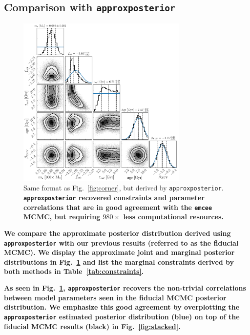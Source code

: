 \documentclass[twocolumn]{aastex62}
\newcommand{\xxx}[1]{{\textbf{#1}}}
\newcommand{\emcee}[0]{\texttt{emcee}\xspace}
\newcommand{\approxposterior}[0]{\texttt{approxposterior}\xspace}
\begin{document}
\subsection{Comparison with \approxposterior} \label{sec:approx}


\begin{figure}
\centering
	\includegraphics[width=0.75\textwidth]{../Analysis/Approx/apCorner.pdf}
   \caption{Same format as Fig.~\ref{fig:corner}, but derived by \approxposterior. \xxx{\approxposterior recovered constraints and parameter correlations that are in good agreement with the \emcee MCMC, but requiring $980\times$ less computational resources.}}%
    \label{fig:approx}%
\end{figure}

\xxx{We compare the approximate posterior distribution derived using \approxposterior with our previous results (referred to as the fiducial MCMC). We display the approximate joint and \xxx{marginal} posterior distributions in Fig.~\ref{fig:approx} and list the \xxx{marginal} constraints derived by both methods in Table~\ref{tab:constraints}.}

\xxx{As seen in Fig.~\ref{fig:approx}, \approxposterior recovers the non-trivial correlations between model parameters seen in the fiducial MCMC posterior distribution. We emphasize this good agreement by overplotting the \approxposterior estimated posterior distribution (blue) on top of the fiducial MCMC results (black) in Fig.~\ref{fig:stacked}.}
\end{document}
